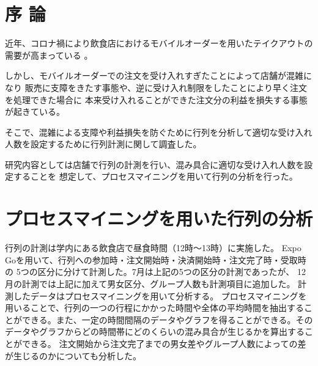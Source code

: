 \documentclass[10pt,twocolumn, a4j]{jsarticle}
\begin{document}

\renewcommand{\thesection}{\arabic{section} .}


\section{序 論}

近年、コロナ禍により飲食店におけるモバイルオーダーを用いたテイクアウトの需要が高まっている
\cite{tyousa1}。

しかし、モバイルオーダーでの注文を受け入れすぎたことによって店舗が混雑になり
販売に支障をきたす事態や、逆に受け入れ制限をしたことにより早く注文を処理できた場合に
本来受け入れることができた注文分の利益を損失する事態が起きている\cite{tyousa2}。

そこで、混雑による支障や利益損失を防ぐために行列を分析して適切な受け入れ人数を設定するために行列計測に関して調査した。

研究内容としては店舗で行列の計測を行い、混み具合に適切な受け入れ人数を設定することを
想定して、プロセスマイニングを用いて行列の分析を行った。



\section{プロセスマイニングを用いた行列の分析}

行列の計測は学内にある飲食店で昼食時間（12時〜13時）に実施した。
Expo Goを用いて、行列への参加時・注文開始時・決済開始時・注文完了時・受取時の
5つの区分に分けて計測した。7月は上記の5つの区分の計測であったが、
12月の計測では上記に加えて男女区分、グループ人数も計測項目に追加した。
計測したデータはプロセスマイニングを用いて分析する。
プロセスマイニングを用いることで、行列の一つの行程にかかった時間や全体の平均時間を抽出することができる。また、一定の時間間隔のデータやグラフを得ることができる。そのデータやグラフからどの時間帯にどのくらいの混み具合が生じるかを算出することができる。
注文開始から注文完了までの男女差やグループ人数によっての差が生じるのかについても分析した。
\end{document}
